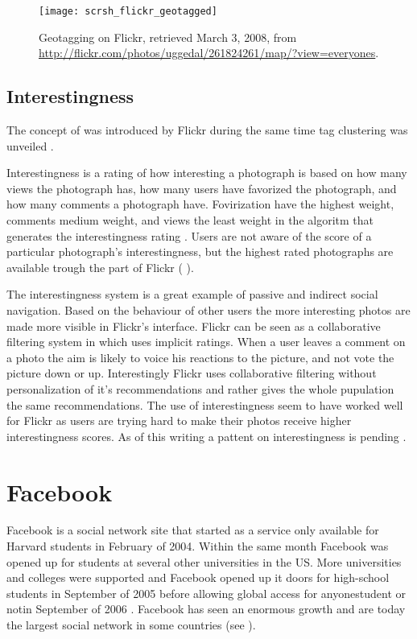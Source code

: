 \begin{figure}
  \texttt{[image: scrsh\_flickr\_geotagged]}
  \caption[Flickr Geotagging]{%
     Geotagging on Flickr,
     retrieved March 3, 2008, from
     \url{http://flickr.com/photos/uggedal/261824261/map/?view=everyones}.}
  \label{figure:scrsh.flickr.geotagged}
\end{figure}

\subsection{Interestingness}
\label{section:analysis.flickr.interestingness}

The concept of  was introduced by Flickr during
the same time tag clustering was unveiled \citep{butterfield05}.

Interestingness is a rating of how interesting a photograph is based on
how many views the photograph has, how many users have favorized the
photograph, and how many comments a photograph have. Fovirization have the
highest weight, comments medium weight, and views the least weight
in the algoritm that generates the interestingness rating \citep{dean08}.
Users are not aware of the score of a particular photograph's interestingness,
but the highest rated photographs are available trough the  part of
Flickr
(
).

The interestingness system is a great example of passive and indirect social
navigation. Based on the behaviour of other users the more interesting photos
are made more visible in Flickr's interface. Flickr can be seen as a
collaborative filtering system in which uses implicit ratings. When a user
leaves a comment on a photo the aim is likely to voice his reactions to the
picture, and not vote the picture down or up. Interestingly Flickr uses
collaborative filtering without personalization of it's recommendations and
rather gives the whole pupulation the same recommendations.
The use of interestingness seem
to have worked well for Flickr as users are trying hard to make their photos
receive higher interestingness scores.
As of this writing a pattent on interestingness is pending
\citep{butterfield06b}.

\section{Facebook}
\label{section:analysis.facebook}

Facebook is a social network site that started as a service only available for
Harvard students in February of 2004. Within the same month Facebook was
opened up for students at several other universities in the
US. More universities and colleges were supported and Facebook opened up it
doors for high-school students in September of 2005 \citep{cassidy06}
before allowing global access for anyone\dash{}student or not\dash{}in
September of 2006 \citep{abram06}.
Facebook has seen an enormous growth and are today the largest social network
in some countries (see
).

